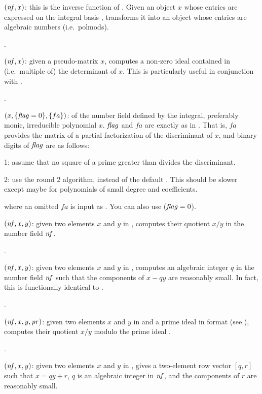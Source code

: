 $(\hbox{\it nf\/},x)$: this is the inverse function of
. Given an object $x$ whose entries are expressed on the
integral basis , transforms it into an object whose entries
are algebraic numbers (i.e.~polmods).

.

$(\hbox{\it nf\/},x)$: given a pseudo-matrix $x$, computes a
non-zero ideal contained in (i.e.~multiple of) the determinant of $x$. This
is particularly useful in conjunction with .

.

$(x,\{\hbox{\it f\kern0pt lag\/}=0\},\{fa\})$:  of the
number field defined by the integral, preferably monic, irreducible
polynomial $x$. $\hbox{\it f\kern0pt lag\/}$ and $fa$ are exactly as in . That is, $fa$
provides the matrix of a partial factorization of the discriminant of $x$,
and binary digits of $\hbox{\it f\kern0pt lag\/}$ are as follows:

1: assume that no square of a prime greater than 
divides the discriminant.

2: use the round 2 algorithm, instead of the default . This
should be slower except maybe for polynomials of small degree and
coefficients.

 where an omitted $fa$ is input as . You
can also use  ($\hbox{\it f\kern0pt lag\/}=0$).

$(\hbox{\it nf\/},x,y)$: given two elements $x$ and $y$ in
, computes their quotient $x/y$ in the number field $\hbox{\it nf\/}$.

.

$(\hbox{\it nf\/},x,y)$: given two elements $x$ and $y$ in
, computes an algebraic integer $q$ in the number field $\hbox{\it nf\/}$
such that the components of $x-qy$ are reasonably small. In fact, this is
functionally identical to .

.

$(\hbox{\it nf\/},x,y,\hbox{\it pr\/})$: given two elements $x$
and $y$ in  and  a prime ideal in  format (see
), computes their quotient $x / y$ modulo the prime ideal
.

.

$(\hbox{\it nf\/},x,y)$: given two elements $x$ and $y$ in
, gives a two-element row vector $[q,r]$ such that $x=qy+r$, $q$ is
an algebraic integer in $\hbox{\it nf\/}$, and the components of $r$ are
reasonably small.

